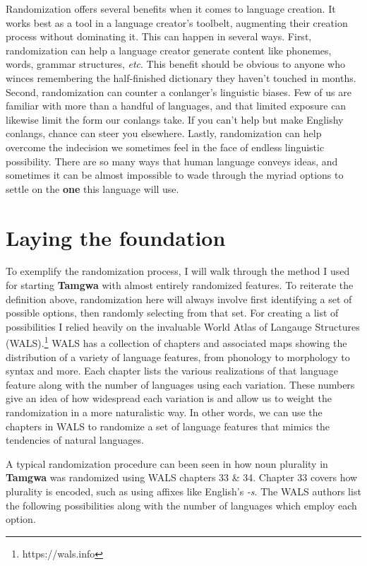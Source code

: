 \documentclass[a4paper,12pt,twoside,openright]{memoir}
\begin{document}
    Randomization offers several benefits when it comes to language creation.  It works best as a tool in a language creator's toolbelt, augmenting their creation process without dominating it.  This can happen in several ways.  First, randomization can help a language creator generate content like phonemes, words, grammar structures, \textit{etc}.  This benefit should be obvious to anyone who winces remembering the half-finished dictionary they haven't touched in months. Second, randomization can counter a conlanger's linguistic biases.  Few of us are familiar with more than a handful of languages, and that limited exposure can likewise limit the form our conlangs take.  If you can't help but make Englishy conlangs, chance can steer you elsewhere.  Lastly, randomization can help overcome the indecision we sometimes feel in the face of endless linguistic possibility.  There are so many ways that human language conveys ideas, and sometimes it can be almost impossible to wade through the myriad options to settle on the \textbf{one} this language will use.

\section*{Laying the foundation} %

    To exemplify the randomization process, I will walk through the method I used for starting \textbf{Tamgwa} with almost entirely randomized features.  To reiterate the definition above, randomization here will always involve first identifying a set of possible options, then randomly selecting from that set.  For creating a list of possibilities I relied heavily on the invaluable World Atlas of Langauge Structures (WALS).\footnote{https://wals.info}  WALS has a collection of chapters and associated maps showing the distribution of a variety of language features, from phonology to morphology to syntax and more.  Each chapter lists the various realizations of that language feature along with the number of languages using each variation.  These numbers give an idea of how widespread each variation is and allow us to weight the randomization in a more naturalistic way.  In other words, we can use the chapters in WALS to randomize a set of language features that mimics the tendencies of natural languages.

     A typical randomization procedure can been seen in how noun plurality in \textbf{Tamgwa} was randomized using WALS chapters 33 \& 34.  Chapter 33 covers how plurality is encoded, such as using affixes like English's \textit{-s}.  The WALS authors list the following possibilities along with the number of languages which employ each option.
\end{document}
